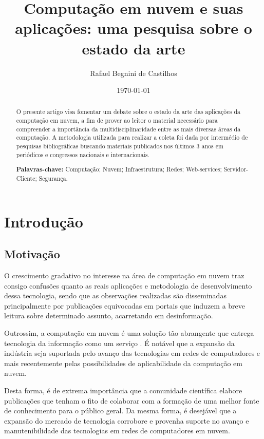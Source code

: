 \documentclass[12pt]{article}
\author{Rafael Begnini de Castilhos}
\title{Computação em nuvem e suas aplicações: uma pesquisa sobre o estado da arte}
\date{\today}
\begin{document}
\maketitle

\begin{abstract}
O presente artigo visa fomentar um debate sobre o estado da arte das aplicações da computação em nuvem, a fim de prover ao leitor o material necessário para compreender a importância da multidisciplinaridade entre as mais diversas áreas da computação. A metodologia utilizada para realizar a coleta foi dada por intermédio de pesquisas bibliográficas buscando materiais publicados nos últimos 3 anos em periódicos e congressos nacionais e internacionais.

\textbf{Palavras-chave:} Computação; Nuvem; Infraestrutura; Redes; Web-services; Servidor-Cliente; Segurança.

\end{abstract}

\section{Introdução}

\subsection{Motivação}

O crescimento gradativo no interesse na área de computação em nuvem traz consigo confusões quanto as reais aplicações e metodologia de desenvolvimento dessa tecnologia, sendo que as observações realizadas são disseminadas principalmente por publicações equivocadas em portais que induzem a breve leitura sobre determinado assunto, acarretando em desinformação. 

Outrossim, a computação em nuvem é uma solução tão abrangente que entrega tecnologia da informação como um serviço \cite{oliveira}. É notável que a expansão da indústria seja suportada pelo avanço das tecnologias em redes de computadores e mais recentemente pelas possibilidades de aplicabilidade da computação em nuvem.

Desta forma, é de extrema importância que a comunidade científica elabore publicações que tenham o fito de colaborar com a formação de uma melhor fonte de conhecimento para o público geral. Da mesma forma, é desejável que a expansão do mercado de tecnologia corrobore e provenha suporte no avanço e manutenibilidade das tecnologias em redes de computadores em nuvem.
\end{document}
